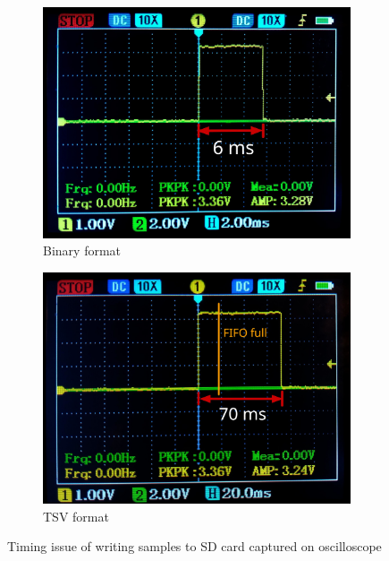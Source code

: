 \begin{figure}[h]
    \centering
    \begin{subfigure}[b]{0.49\textwidth}
        \includegraphics[width=\textwidth]{assets/design/oscilloscope/bin-fomat.jpg}
        \caption{Binary format}
        \label{fig:implementation:binary-format}
    \end{subfigure}
    \hfill
    \begin{subfigure}[b]{0.49\textwidth}
        \includegraphics[width=\textwidth]{assets/design/oscilloscope/tsv-format.jpg}
        \caption{TSV format}
        \label{fig:implementation:tsv-format}
    \end{subfigure}
    \caption{Timing issue of writing samples to SD card captured on oscilloscope}
    \label{fig:implementation:file-write}
\end{figure}

